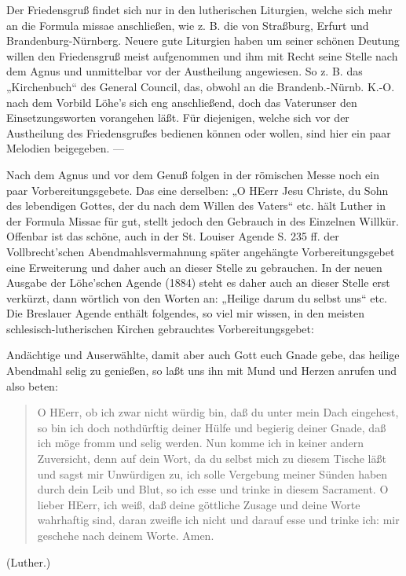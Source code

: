 Der Friedensgruß findet sich nur in den lutherischen Liturgien, welche sich mehr an die Formula missae anschließen, wie z. B. die von Straßburg, Erfurt und Brandenburg-Nürnberg. Neuere gute Liturgien haben um seiner schönen Deutung willen den Friedensgruß meist aufgenommen und ihm mit Recht seine Stelle nach dem Agnus und unmittelbar vor der Austheilung angewiesen. So z. B. das „Kirchenbuch“ des General Council, das, obwohl an die Brandenb.-Nürnb. K.-O. nach dem Vorbild Löhe’s sich eng anschließend, doch das Vaterunser den Einsetzungsworten vorangehen läßt. Für diejenigen, welche sich vor der Austheilung des Friedensgrußes bedienen können oder wollen, sind hier ein paar Melodien beigegeben. —

Nach dem Agnus und vor dem Genuß folgen in der römischen Messe noch ein paar Vorbereitungsgebete. Das eine derselben: „O HEerr Jesu Christe, du Sohn des lebendigen Gottes, der du nach dem Willen des Vaters“ etc. hält Luther in der Formula Missae für gut, stellt jedoch den Gebrauch in des Einzelnen Willkür. Offenbar ist das schöne, auch in der St. Louiser Agende S. 235 ff. der Vollbrecht’schen Abendmahlsvermahnung später angehängte Vorbereitungsgebet eine Erweiterung und daher auch an dieser Stelle zu gebrauchen. In der neuen Ausgabe der Löhe’schen Agende (1884) steht es daher auch an dieser Stelle erst verkürzt, dann wörtlich von den Worten an: „Heilige darum du selbst uns“ etc. Die Breslauer Agende enthält folgendes, so viel mir wissen, in den meisten schlesisch-lutherischen Kirchen gebrauchtes Vorbereitungsgebet:

Andächtige und Auserwählte, damit aber auch Gott euch Gnade gebe, das heilige Abendmahl selig zu genießen, so laßt uns ihn mit Mund und Herzen anrufen und also beten:

\begin{quote}
O HEerr, ob ich zwar nicht würdig bin, daß du unter mein Dach eingehest, so bin ich doch nothdürftig deiner Hülfe und begierig deiner Gnade, daß ich möge fromm und selig werden. Nun komme ich in keiner andern Zuversicht, denn auf dein Wort, da du selbst mich zu diesem Tische läßt und sagst mir Unwürdigen zu, ich solle Vergebung meiner Sünden haben durch dein Leib und Blut, so ich esse und trinke in diesem Sacrament. O lieber HEerr, ich weiß, daß deine göttliche Zusage und deine Worte wahrhaftig sind, daran zweifle ich
nicht und darauf esse und trinke ich: mir geschehe nach deinem Worte. Amen.
\end{quote}

(Luther.)

